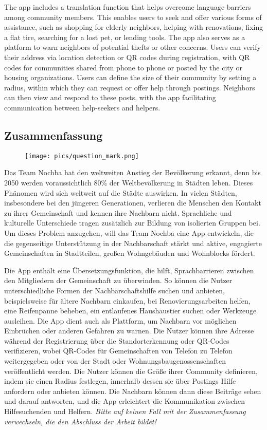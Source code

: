 The app includes a translation function that helps overcome language barriers among community members. This enables users to seek and offer various forms of assistance, such as shopping for elderly neighbors, helping with renovations, fixing a flat tire, searching for a lost pet, or lending tools. The app also serves as a platform to warn neighbors of potential thefts or other concerns. Users can verify their address via location detection or QR codes during registration, with QR codes for communities shared from phone to phone or posted by the city or housing organizations. Users can define the size of their community by setting a radius, within which they can request or offer help through postings. Neighbors can then view and respond to these posts, with the app facilitating communication between help-seekers and helpers.
\lipsum[6]
\newpage
\begin{spacing}{1}
    \chapter*{Zusammenfassung}
\end{spacing}
\begin{wrapfigure}{r}{0.3\textwidth}
    \begin{center}
      \texttt{[image: pics/question\_mark.png]}
    \end{center}
\end{wrapfigure}
Das Team Nochba hat den weltweiten Anstieg der Bevölkerung erkannt, denn bis 2050 werden voraussichtlich 80\% der Weltbevölkerung in Städten leben. Dieses Phänomen wird sich weltweit auf die Städte auswirken. In vielen Städten, insbesondere bei den jüngeren Generationen, verlieren die Menschen den Kontakt zu ihrer Gemeinschaft und kennen ihre Nachbarn nicht. Sprachliche und kulturelle Unterschiede tragen zusätzlich zur Bildung von isolierten Gruppen bei. Um dieses Problem anzugehen, will das Team Nochba eine App entwickeln, die die gegenseitige Unterstützung in der Nachbarschaft stärkt und aktive, engagierte Gemeinschaften in Stadtteilen, großen Wohngebäuden und Wohnblocks fördert.

Die App enthält eine Übersetzungsfunktion, die hilft, Sprachbarrieren zwischen den Mitgliedern der Gemeinschaft zu überwinden. So können die Nutzer unterschiedliche Formen der Nachbarschaftshilfe suchen und anbieten, beispielsweise für ältere Nachbarn einkaufen, bei Renovierungsarbeiten helfen, eine Reifenpanne beheben, ein entlaufenes Haushaustier suchen oder Werkzeuge ausleihen. Die App dient auch als Plattform, um Nachbarn vor möglichen Einbrüchen oder anderen Gefahren zu warnen. Die Nutzer können ihre Adresse während der Registrierung über die Standorterkennung oder QR-Codes verifizieren, wobei QR-Codes für Gemeinschaften von Telefon zu Telefon weitergegeben oder von der Stadt oder Wohnungsbaugenossenschaften veröffentlicht werden. Die Nutzer können die Größe ihrer Community definieren, indem sie einen Radius festlegen, innerhalb dessen sie über Postings Hilfe anfordern oder anbieten können. Die Nachbarn können dann diese Beiträge sehen und darauf antworten, und die App erleichtert die Kommunikation zwischen Hilfesuchenden und Helfern.
\emph{Bitte auf keinen Fall mit der Zusammenfassung verwechseln, die den Abschluss der Arbeit bildet!}
\lipsum[6]

